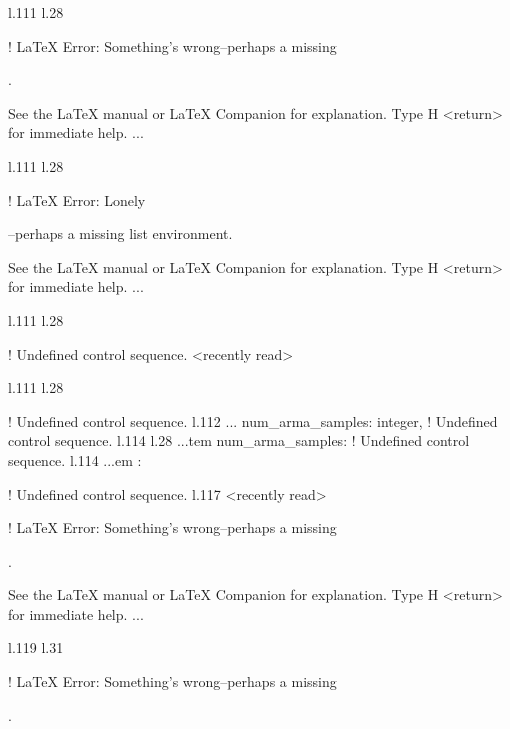 {{{{{{{{{{{{{{{{{{l.111 l.28     \item \xmlNode
                             

! LaTeX Error: Something's wrong--perhaps a missing \item.

See the LaTeX manual or LaTeX Companion for explanation.
Type  H <return>  for immediate help.
 ...                                              
                                                  
l.111 l.28     \item \xmlNode
                             

! LaTeX Error: Lonely \item--perhaps a missing list environment.

See the LaTeX manual or LaTeX Companion for explanation.
Type  H <return>  for immediate help.
 ...                                              
                                                  
l.111 l.28     \item \xmlNode
                             
! Undefined control sequence.
<recently read> \xmlNode 
                         
l.111 l.28     \item \xmlNode
                             
! Undefined control sequence.
l.112 ...           {num\_arma\_samples}: \xmlDesc
                                                  {integer},
! Undefined control sequence.
l.114 l.28 ...tem \xmlNode
                          {num\_arma\_samples}: \xmlDesc
! Undefined control sequence.
l.114 ...em : \xmlDesc
                                                  
! Undefined control sequence.
l.117 <recently read> \xmlNode
                              

! LaTeX Error: Something's wrong--perhaps a missing \item.

See the LaTeX manual or LaTeX Companion for explanation.
Type  H <return>  for immediate help.
 ...                                              
                                                  
l.119 l.31     \item \xmlNode
                             

! LaTeX Error: Something's wrong--perhaps a missing \item.

}}}}}}}}}}}}}}}}}}
